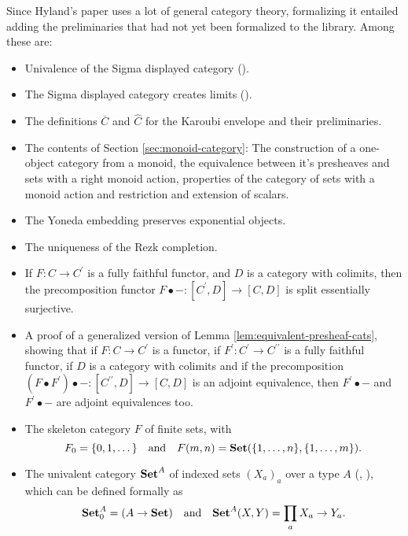 Since Hyland's paper uses a lot of general category theory, formalizing it entailed adding the preliminaries that had not yet been formalized to the library. Among these are:
\begin{itemize}
  \item Univalence of the Sigma displayed category ().
  \item The Sigma displayed category creates limits ().
  \item The definitions $ \overline C $ and $ \hat C $ for the Karoubi envelope and their preliminaries.
  \item The contents of Section \ref{sec:monoid-category}: The construction of a one-object category from a monoid, the equivalence between it's presheaves and sets with a right monoid action, properties of the category of sets with a monoid action and restriction and extension of scalars.
  \item The Yoneda embedding preserves exponential objects.
  \item The uniqueness of the Rezk completion.
  \item If $ F : C \to C^\prime $ is a fully faithful functor, and $ D $ is a category with colimits, then the precomposition functor $ F \bullet - : [C^\prime, D] \to [C, D] $ is split essentially surjective.
  \item A proof of a generalized version of Lemma \ref{lem:equivalent-presheaf-cats}, showing that if $ F : C \to C^\prime $ is a functor, if $ F^\prime : C^\prime \to C^{\prime \prime} $ is a fully faithful functor, if $ D $ is a category with colimits and if the precomposition $ (F \bullet F^\prime) \bullet - : [C^{\prime \prime}, D] \to [C, D] $ is an adjoint equivalence, then $ F^\prime \bullet - $ and $ F^\prime \bullet - $ are adjoint equivalences too.
  \item The skeleton category $ F $ of finite sets, with
  \[ F_0 = \{ 0, 1, \dots \} \quad \text{and} \quad F(m, n) = \mathbf{Set}(\{ 1, \dots, n \}, \{ 1, \dots, m \}). \]
  \item The univalent category $ \mathbf{Set}^A $ of indexed sets $ (X_a)_a $ over a type $ A $ (, ), which can be defined formally as
  \[ \mathbf{Set}^A_0 = (A \to \mathbf{Set}) \quad \text{and} \quad \mathbf{Set}^A(X, Y) = \prod_a X_a \to Y_a. \]
\end{itemize}

